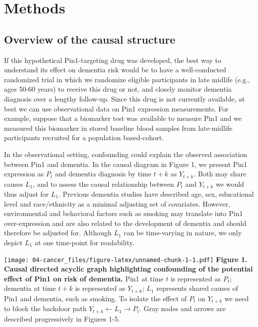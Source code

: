 \documentclass[
]{book}
\begin{document}
\hypertarget{methods-2}{%
\section{Methods}\label{methods-2}}

\hypertarget{overview-of-the-causal-structure}{%
\subsection{Overview of the causal structure}\label{overview-of-the-causal-structure}}

If this hypothetical Pin1-targeting drug was developed, the best way to understand its effect on dementia risk would be to have a well-conducted randomized trial in which we randomize eligible participants in late midlife (e.g., ages 50-60 years) to receive this drug or not, and closely monitor dementia diagnosis over a lengthy follow-up. Since this drug is not currently available, at best we can use observational data on Pin1 expression measurements. For example, suppose that a biomarker test was available to measure Pin1 and we measured this biomarker in stored baseline blood samples from late-midlife participants recruited for a population based-cohort.

In the observational setting, confounding could explain the observed association between Pin1 and dementia. In the causal diagram\autocite{whatif2020} in Figure 1, we present Pin1 expression as \(P_{t}\) and dementia diagnosis by time \(t+k\) as \(Y_{t+k}\). Both may share causes \(L_1\), and to assess the causal relationship between \(P_{t}\) and \(Y_{t+k}\) we would thus adjust for \(L_1\). Previous dementia studies have described age, sex, educational level and race/ethnicity as a minimal adjusting set of covariates\autocite{ospina2020}. However, environmental and behavioral factors such as smoking may translate into Pin1 over-expression\autocite{tan2010} and are also related to the development of dementia\autocite{dementia_lancet} and should therefore be adjusted for. Although \(L_1\) can be time-varying in nature, we only depict \(L_1\) at one time-point for readability.

\texttt{[image: 04-cancer\_files/figure-latex/unnamed-chunk-1-1.pdf]}
\textbf{Figure 1. Causal directed acyclic graph highlighting confounding of the potential effect of Pin1 on risk of dementia.} Pin1 at time \(t\) is represented as \(P_t\); dementia at time \(t+k\) is represented as \(Y_{t+k}\); \(L_1\) represents shared causes of Pin1 and dementia, such as smoking. To isolate the effect of \(P_t\) on \(Y_{t+k}\) we need to block the backdoor path \(Y_{t+k} \leftarrow L_1 \rightarrow P_t\). Gray nodes and arrows are described progressively in Figures 1-5.
\end{document}
